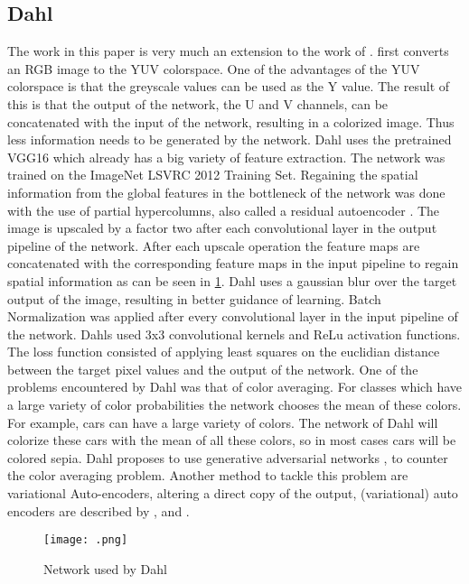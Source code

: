 \subsection{Dahl}
The work in this paper is very much an extension to the work of \cite{Dahl}. \cite{Dahl} first converts an RGB image to the YUV colorspace. One of the advantages of the YUV colorspace is that the greyscale values can be used as the Y value. The result of this is that the output of the network, the U and V channels, can be concatenated with the input of the network, resulting in a colorized image. Thus less information needs to be generated by the network. Dahl uses the pretrained VGG16 which already has a big variety of feature extraction. The network was trained on the ImageNet LSVRC 2012 Training Set. Regaining the spatial information from the global features in the bottleneck of the network was done with the use of partial hypercolumns, also called a residual autoencoder \cite{hariharan2015hypercolumns}. The image is upscaled by a factor two after each convolutional layer in the output pipeline of the network. After each upscale operation the feature maps are concatenated with the corresponding feature maps in the input pipeline to regain spatial information as can be seen in \ref{fig:dahlnetwork}. Dahl uses a gaussian blur over the target output of the image, resulting in better guidance of learning. Batch Normalization was applied after every convolutional layer in the input pipeline of the network. Dahls used 3x3 convolutional kernels and ReLu activation functions. The loss function consisted of applying least squares on the euclidian distance between the target pixel values and the output of the network. One of the problems encountered by Dahl was that of color averaging. For classes which have a large variety of color probabilities the network chooses the mean of these colors. For example, cars can have a large variety of colors. The network of Dahl will colorize these cars with the mean of all these colors, so in most cases cars will be colored sepia. Dahl proposes to use generative adversarial networks \cite{Radford}, to counter the color averaging problem. Another method to tackle this problem are variational Auto-encoders, altering a direct copy of the output, (variational) auto encoders are described by \cite{Gregor}, \cite{Kingma} and \cite{GoodfellowBOOK}. 

\begin{figure}
	\centering
	\texttt{[image: .png]}
	\caption{Network used by Dahl \cite{Dahl}}
	\label{fig:dahlnetwork}
\end{figure}


